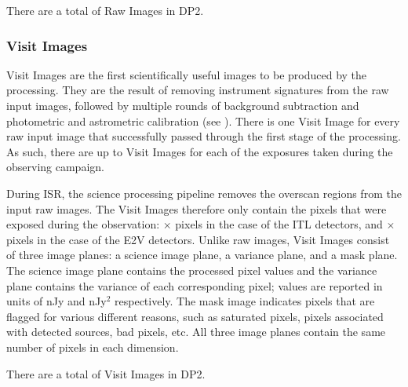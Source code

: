 There are a total of \nraws Raw Images in DP2.

\subsubsection{Visit Images}
\label{sssec:visitimages}
\glspl{Visit Image} are the first scientifically useful images to be produced by the processing.
They are the result of removing instrument signatures from the raw input images, followed by multiple rounds of background subtraction and photometric and astrometric \gls{calibration} (see ).
There is one \gls{Visit Image} for every raw input image that successfully passed through the first stage of the processing.
As such, there are up to \nactivedetectors \glspl{Visit Image} for each of the exposures taken during the observing campaign.

During \gls{ISR}, the science processing \gls{pipeline} removes the overscan regions from the input raw images.
The \glspl{Visit Image} therefore only contain the pixels that were exposed during the observation: \nitlpixx $\times$ \nitlpixy pixels in the case of the \gls{ITL} detectors, and \netvpixx $\times$ \netvpixy pixels in the case of the \gls{E2V} detectors.
Unlike raw images, \glspl{Visit Image} consist of three image planes: a science image plane, a variance plane, and a mask plane.
The science image plane contains the processed pixel values and the variance plane contains the variance of each corresponding pixel;  values are reported in units of nJy and nJy$^2$ respectively.
The mask image indicates pixels that are flagged for various different reasons, such as saturated pixels, pixels associated with detected sources, bad pixels, etc.
All three image planes contain the same number of pixels in each dimension.

There are a total of \nvisitimages Visit Images in DP2.

